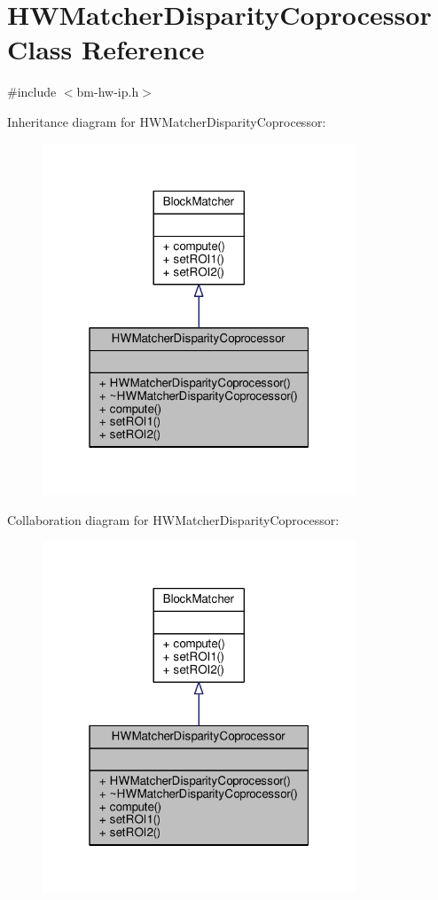 \hypertarget{classHWMatcherDisparityCoprocessor}{}\section{H\+W\+Matcher\+Disparity\+Coprocessor Class Reference}
\label{classHWMatcherDisparityCoprocessor}


{\ttfamily \#include $<$bm-\/hw-\/ip.\+h$>$}



Inheritance diagram for H\+W\+Matcher\+Disparity\+Coprocessor\+:
\nopagebreak
\begin{figure}[H]
\begin{center}
\leavevmode
\includegraphics[width=265pt]{classHWMatcherDisparityCoprocessor__inherit__graph}
\end{center}
\end{figure}


Collaboration diagram for H\+W\+Matcher\+Disparity\+Coprocessor\+:
\nopagebreak
\begin{figure}[H]
\begin{center}
\leavevmode
\includegraphics[width=265pt]{classHWMatcherDisparityCoprocessor__coll__graph}
\end{center}
\end{figure}

